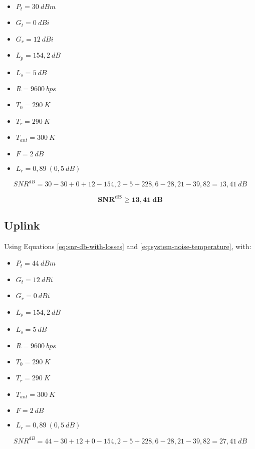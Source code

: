 \begin{itemize}
    \item $P_{t} = 30\ dBm$
    \item $G_{t} = 0\ dBi$
    \item $G_{r} = 12\ dBi$
    \item $L_{p} = 154,2\ dB$
    \item $L_{s} = 5\ dB$
    \item $R = 9600\ bps$
    \item $T_{0} = 290\ K$
    \item $T_{r} = 290\ K$
    \item $T_{ant} = 300\ K$
    \item $F = 2\ dB$
    \item $L_{r} = 0,89\ (0,5\ dB)$
\end{itemize}

\begin{equation}
    SNR^{dB} = 30 - 30 + 0 + 12 - 154,2 - 5 + 228,6 - 28,21 - 39,82 = 13,41\ dB
\end{equation}

\begin{equation}
\mathbf{SNR^{dB} \geq 13,41\ dB}
\end{equation}

\subsection{Uplink}

Using Equations \ref{eq:snr-db-with-losses} and \ref{eq:system-noise-temperature}, with:

\begin{itemize}
    \item $P_{t} = 44\ dBm$
    \item $G_{t} = 12\ dBi$
    \item $G_{r} = 0\ dBi$
    \item $L_{p} = 154,2\ dB$
    \item $L_{s} = 5\ dB$
    \item $R = 9600\ bps$
    \item $T_{0} = 290\ K$
    \item $T_{r} = 290\ K$
    \item $T_{ant} = 300\ K$
    \item $F = 2\ dB$
    \item $L_{r} = 0,89\ (0,5\ dB)$
\end{itemize}

\begin{equation}
    SNR^{dB} = 44 - 30 + 12 + 0 - 154,2 - 5 + 228,6 - 28,21 - 39,82 = 27,41\ dB
\end{equation}

